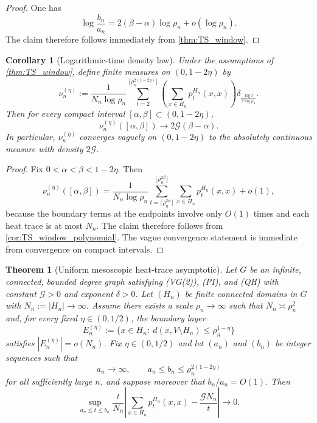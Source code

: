 \documentclass[reqno]{amsart}
\numberwithin{equation}{section}
\newtheorem{theorem}{Theorem}[section]
\newtheorem{corollary}[corollary]{Corollary}
\theoremstyle{definition}
\theoremstyle{remark}
\newcommand{\Cref}[1]{\autoref{#1}}
\newcommand{\cG}{\mathcal{G}}
\begin{document}
\begin{proof}
One has
\[
  \log\frac{b_n}{a_n}
  =
  2(\beta-\alpha)\log \rho_n+o(\log \rho_n).
\]
The claim therefore follows immediately from \Cref{thm:TS_window}.
\end{proof}

\begin{corollary}[Logarithmic-time density law]\label{cor:TS_log_density}
Under the assumptions of \Cref{thm:TS_window}, define finite measures on $(0,1-2\eta)$ by
\[
  \nu_n^{(\eta)}
  :=
  \frac{1}{N_n\log\rho_n}
  \sum_{t=2}^{\lfloor \rho_n^{2(1-2\eta)}\rfloor}
  \left(\sum_{x\in H_n} p_t^{H_n}(x,x)\right)
  \delta_{\frac{\log t}{2\log\rho_n}}.
\]
Then for every compact interval $[\alpha,\beta]\subset(0,1-2\eta)$,
\[
  \nu_n^{(\eta)}([\alpha,\beta])\longrightarrow 2\cG(\beta-\alpha).
\]
In particular, $\nu_n^{(\eta)}$ converges vaguely on $(0,1-2\eta)$ to the absolutely continuous measure with density $2\cG$.
\end{corollary}

\begin{proof}
Fix $0<\alpha<\beta<1-2\eta$. Then
\[
  \nu_n^{(\eta)}([\alpha,\beta])
  =
  \frac{1}{N_n\log\rho_n}
  \sum_{t=\lceil \rho_n^{2\alpha}\rceil}^{\lfloor \rho_n^{2\beta}\rfloor}
  \sum_{x\in H_n} p_t^{H_n}(x,x)
  + o(1),
\]
because the boundary terms at the endpoints involve only $O(1)$ times and each heat trace is at most $N_n$. The claim therefore follows from \Cref{cor:TS_window_polynomial}. The vague convergence statement is immediate from convergence on compact intervals.
\end{proof}

\begin{theorem}[Uniform mesoscopic heat-trace asymptotic]\label{thm:mesoscopic_heat_trace}
Let $G$ be an infinite, connected, bounded degree graph satisfying \textup{(VG(2))}, \textup{(PI)}, and \textup{(QH)} with constant $\cG>0$ and exponent $\delta>0$. Let $(H_n)$ be finite connected domains in $G$ with $N_n:=|H_n|\to\infty$. Assume there exists a scale $\rho_n\to\infty$ such that $N_n\asymp \rho_n^2$ and, for every fixed $\eta\in(0,1/2)$, the boundary layer
\[
  E_n^{(\eta)}:=\{x\in H_n:\ d(x,V\setminus H_n)\le \rho_n^{1-\eta}\}
\]
satisfies $|E_n^{(\eta)}|=o(N_n)$. Fix $\eta\in(0,1/2)$ and let $(a_n)$ and $(b_n)$ be integer sequences such that
\[
  a_n\to\infty,
  \qquad
  a_n\le b_n\le \rho_n^{2(1-2\eta)}
\]
for all sufficiently large $n$, and suppose moreover that $b_n/a_n=O(1)$. Then
\[
  \sup_{a_n\le t\le b_n}
  \frac{t}{N_n}
  \left|
    \sum_{x\in H_n} p_t^{H_n}(x,x)-\frac{\cG N_n}{t}
  \right|
  \longrightarrow 0.
\]
\end{theorem}
\end{document}
